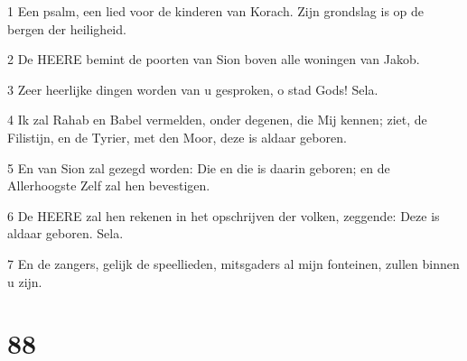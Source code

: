 \par 1 Een psalm, een lied voor de kinderen van Korach. Zijn grondslag is op de bergen der heiligheid.
\par 2 De HEERE bemint de poorten van Sion boven alle woningen van Jakob.
\par 3 Zeer heerlijke dingen worden van u gesproken, o stad Gods! Sela.
\par 4 Ik zal Rahab en Babel vermelden, onder degenen, die Mij kennen; ziet, de Filistijn, en de Tyrier, met den Moor, deze is aldaar geboren.
\par 5 En van Sion zal gezegd worden: Die en die is daarin geboren; en de Allerhoogste Zelf zal hen bevestigen.
\par 6 De HEERE zal hen rekenen in het opschrijven der volken, zeggende: Deze is aldaar geboren. Sela.
\par 7 En de zangers, gelijk de speellieden, mitsgaders al mijn fonteinen, zullen binnen u zijn.

\chapter{88}

